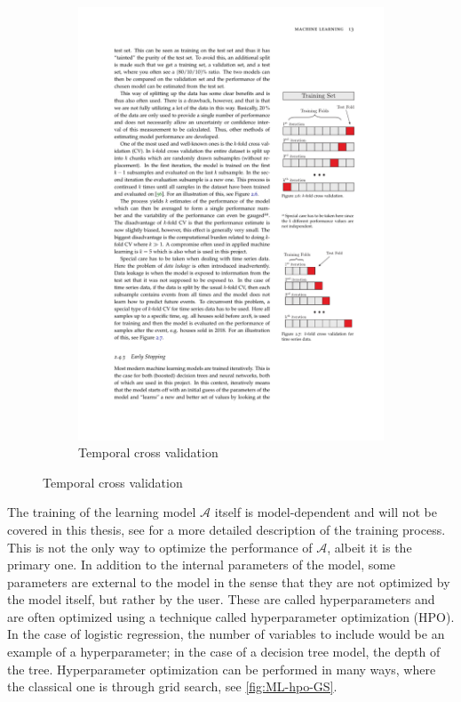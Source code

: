 \begin{figure}[htbp]
\begin{subfigure}{.5\textwidth}
        \includegraphics[trim={14.14cm 7.67cm 2.1cm 16.5cm}, clip, width=.8\linewidth]{figures/MasterThesis-cross-validation}
        \caption{Temporal cross validation}
        \label{fig:ML-crossval-temporal}
    \end{subfigure}
\end{figure}

The training of the learning model $\mathcal{A}$ itself is model-dependent and will not be covered in this thesis, see \parencite{michelsenPhysicistApproachMachine2020} for a more detailed description of the training process. This is not the only way to optimize the performance of  $\mathcal{A}$, albeit it is the primary one. In addition to the internal parameters of the model, some parameters are external to the model in the sense that they are not optimized by the model itself, but rather by the user. These are called hyperparameters and are often optimized using a technique called hyperparameter optimization (HPO). In the case of logistic regression, the number of variables to include would be an example of a hyperparameter; in the case of a decision tree model, the depth of the tree. Hyperparameter optimization can be performed in many ways, where the classical one is through grid search, see \autoref{fig:ML-hpo-GS}.

